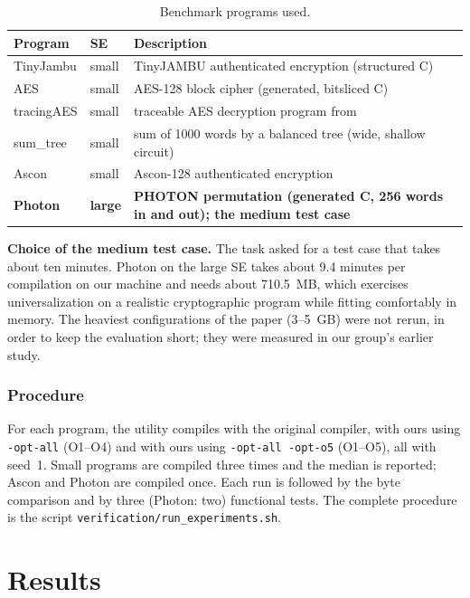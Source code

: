 \documentclass[12pt,a4paper,oneside]{report}
\newcommand{\code}[1]{\texttt{#1}}
\begin{document}
\begin{table}[H]
\centering\small
\caption{Benchmark programs used.}
\label{tab:bench}
\begin{tabularx}{\textwidth}{@{}l l X@{}}
\toprule
Program & SE & Description\\ \midrule
TinyJambu & small & TinyJAMBU authenticated encryption \cite{tinyjambu} (structured C)\\
AES & small & AES-128 block cipher \cite{aes} (generated, bitsliced C)\\
tracingAES & small & traceable AES decryption program from \cite{obscure}\\
sum\_tree & small & sum of 1000 words by a balanced tree (wide, shallow circuit)\\
Ascon & small & Ascon-128 authenticated encryption \cite{ascon}\\
\textbf{Photon} & \textbf{large} & \textbf{PHOTON permutation \cite{photon} (generated C, 256 words in and out); the medium test case}\\
\bottomrule
\end{tabularx}
\end{table}

\textbf{Choice of the medium test case.} The task asked for a test case that takes about ten
minutes. Photon on the large SE takes about 9.4 minutes per compilation on our machine and needs
about 710.5~MB, which exercises universalization on a realistic cryptographic program while
fitting comfortably in memory. The heaviest configurations of the paper (3--5~GB) were not rerun,
in order to keep the evaluation short; they were measured in our group's earlier study.

\subsection{Procedure}
For each program, the utility compiles with the original compiler, with ours using
\code{-opt-all} (O1--O4) and with ours using \code{-opt-all -opt-o5} (O1--O5), all with seed~1.
Small programs are compiled three times and the median is reported; Ascon and Photon are compiled
once. Each run is followed by the byte comparison and by three (Photon: two) functional tests.
The complete procedure is the script \code{verification/run\_experiments.sh}.

\chapter{Results}
\end{document}
